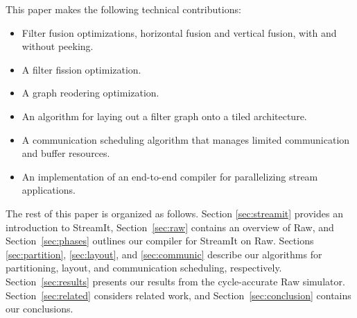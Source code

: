This paper makes the following technical contributions:
\begin{itemize}
\item Filter fusion optimizations, horizontal fusion and vertical fusion, with and without peeking.
\item A filter fission optimization.
\item A graph reodering optimization.
\item An algorithm for laying out a filter graph onto a tiled architecture.
\item A communication scheduling algorithm that manages limited 
communication and buffer resources.
\item An implementation of an end-to-end compiler for parallelizing stream applications.
\end{itemize}

The rest of this paper is organized as follows.  Section
\ref{sec:streamit} provides an introduction to StreamIt,
Section~\ref{sec:raw} contains an overview of Raw, and
Section~\ref{sec:phases} outlines our compiler for StreamIt on Raw.
Sections \ref{sec:partition}, \ref{sec:layout}, and \ref{sec:communic}
describe our algorithms for partitioning, layout, and communication
scheduling, respectively.  Section~\ref{sec:results} presents our
results from the cycle-accurate Raw simulator.
Section~\ref{sec:related} considers related work, and
Section~\ref{sec:conclusion} contains our conclusions.
